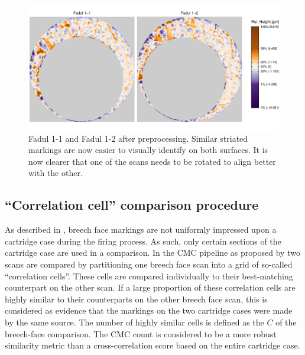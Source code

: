 \begin{Schunk}
\begin{figure}[htbp]

{\centering \includegraphics[width=\textwidth]{figures/cmcr-unnamed-chunk-10-1} 

}

\caption{\label{fig:processedScans} Fadul 1-1 and Fadul 1-2 after preprocessing. Similar striated markings are now easier to visually identify on both surfaces. It is now clearer that one of the scans needs to be rotated to align better with the other.}\label{fig:unnamed-chunk-10}
\end{figure}
\end{Schunk}

\hypertarget{comparisonProcedure}{%
\subsection{``Correlation cell'' comparison
procedure}\label{comparisonProcedure}}

As described in \citet{song_proposed_2013}, breech face markings are not
uniformly impressed upon a cartridge case during the firing process. As
such, only certain sections of the cartridge case are used in a
comparison. In the CMC pipeline as proposed by
\citet{song_proposed_2013} two scans are compared by partitioning one
breech face scan into a grid of so-called ``correlation cells''. These
cells are compared individually to their best-matching counterpart on
the other scan. If a large proportion of these correlation cells are
highly similar to their counterparts on the other breech face scan, this
is considered as evidence that the markings on the two cartridge cases
were made by the same source. The number of highly similar cells is
defined as the  \(C\) \citep{song_proposed_2013} of the
breech-face comparison. The CMC count is considered to be a more robust
similarity metric than a cross-correlation score based on the entire
cartridge case.

